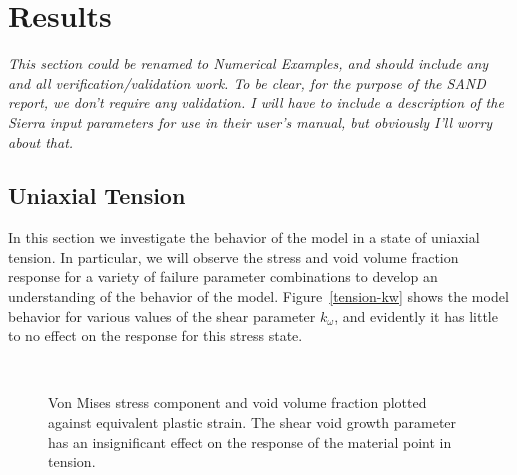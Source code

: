 \chapter{Results}
\label{results}

\textit{This section could be renamed to Numerical Examples, and
  should include any and all verification/validation work. To be
  clear, for the purpose of the SAND report, we don't require any
  validation. I will have to include a description of the Sierra input
  parameters for use in their user's manual, but obviously I'll worry
  about that.}

\section{Uniaxial Tension}
\label{tension}

In this section we investigate the behavior of the model in a state of
uniaxial tension. In particular, we will observe the stress and void
volume fraction response for a variety of failure parameter
combinations to develop an understanding of the behavior of the
model. Figure~\ref{tension-kw} shows the model behavior for various
values of the shear parameter $k_{\omega}$, and evidently it has
little to no effect on the response for this stress state.

\begin{figure}[htbp]
  \begin{center}
    ~ 
    \caption{Von Mises stress component and void volume fraction plotted
      against equivalent plastic strain. The shear void growth
      parameter has an insignificant effect on the response of the
      material point in tension.}
    \label{fig:tension-kw}
  \end{center}
\end{figure}

